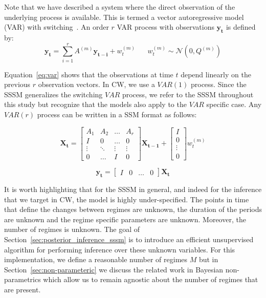 Note that we have described a system where the direct observation of the underlying process is available. This is termed a vector autoregressive model (VAR) with switching~\citep{fox2009nonparametric, shumway2000time,kim1994dynamic}. An order $r$ VAR process with observations $\mathbf{y_t}$ is defined by:
\begin{equation}\label{eq:var}
  \mathbf{y_t} = \sum\limits_{i=1}^{r} A^{(m)}\mathbf{y_{t-i}} + w^{(m)}_t \hspace{20pt} w^{(m)}_t \sim \mathcal{N}(0, Q^{(m)})
\end{equation}

Equation~\ref{eq:var} shows that the observations at time $t$ depend linearly on the previous $r$ observation vectors. In CW, we use a $VAR(1)$ process. Since the SSSM generalizes the switching $VAR$ process, we refer to the SSSM throughout this study but recognize that the models also apply to the $VAR$ specific case. Any $VAR(r)$ process can be written in a SSM format as follows:

\begin{equation}\label{eq:ssm_rep_of_var_state}
  \mathbf{X_t} =
  \begin{bmatrix}
      A_{1}       & A_{2} &  \dots & A_{r} \\
      I           & 0     &  \dots & 0 \\
      \vdots      & \ddots&  \vdots& \vdots \\
      0           & \hdots&   I    & 0
    \end{bmatrix} \mathbf{X_{t-1}} +
  \begin{bmatrix}
    I \\
    0 \\
    \vdots \\
    0
  \end{bmatrix} w^{(m)}_t
\end{equation}

\begin{equation}\label{eq:ssm_rep_of_var_output}
  \mathbf{y_t} = \begin{bmatrix} I & 0 & \hdots & 0 \end{bmatrix} \mathbf{X_t}
\end{equation}

It is worth highlighting that for the SSSM in general, and indeed for the inference that we target in CW, the model is highly under-specified. The points in time that define the changes between regimes are unknown, the duration of the periods are unknown and the regime specific parameters are unknown. Moreover, the number of regimes is unknown. The goal of Section~\ref{sec:posterior_inference_sssm} is to introduce an efficient unsupervised algorithm for performing inference over these unknown variables. For this implementation, we define a reasonable number of regimes $M$ but in Section~\ref{sec:non-parameteric} we discuss the related work in Bayesian non-parametrics which allow us to remain agnostic about the number of regimes that are present.



